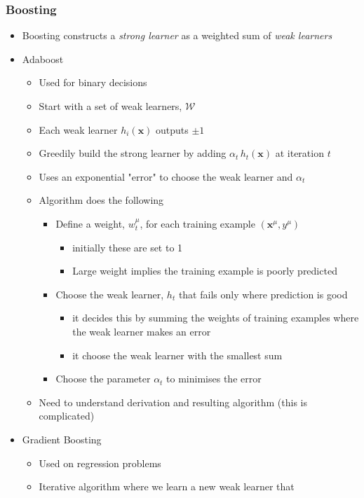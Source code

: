 \documentclass[11pt]{article}
\begin{document}
\subsubsection{Boosting}
\label{sec:org50976e3}
\begin{itemize}
\item Boosting constructs a \emph{strong learner} as a weighted sum of \emph{weak learners}
\item Adaboost
\begin{itemize}
\item Used for binary decisions
\item Start with a set of weak learners, \(\mathcal{W}\)
\item Each weak learner \(h_i(\bm{x})\) outputs \(\pm1\)
\item Greedily build the strong learner by adding \(\alpha_t\,
        h_t(\bm{x})\) at iteration \(t\)
\item Uses an exponential "error" to choose the weak learner and \(\alpha_t\)
\item Algorithm does the following
\begin{itemize}
\item Define a weight, \(w_t^\mu\), for each training example
\((\bm{x}^\mu,y^\mu)\)
\begin{itemize}
\item initially these are set to 1
\item Large weight implies the training example is poorly predicted
\end{itemize}
\item Choose the weak learner, \(h_t\) that fails only where prediction is good
\begin{itemize}
\item it decides this by summing the weights of training
examples where the weak learner makes an error
\item it choose the weak learner with the smallest sum
\end{itemize}
\item Choose the parameter \(\alpha_t\) to minimises the error
\end{itemize}
\item Need to understand derivation and resulting algorithm (this is
complicated)
\end{itemize}
\item Gradient Boosting
\begin{itemize}
\item Used on regression problems
\item Iterative algorithm where we learn a new weak learner that

\end{itemize}
\end{itemize}
\end{document}
